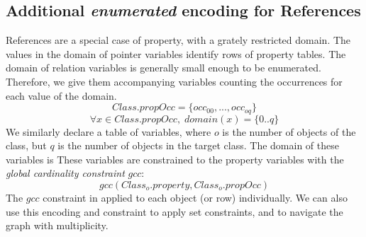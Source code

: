 \subsection{Additional \textit{enumerated} encoding for References}
References are a special case of property, with a grately restricted domain.
The values in the domain of pointer variables identify rows of property tables.
The domain of relation variables is generally small enough to be enumerated.
Therefore, we give them accompanying variables counting the occurrences for each value of the domain.
$$Class.propOcc = \{occ_{00},...,occ_{oq}\}$$
$$\forall x \in Class.propOcc,\;domain(x) = \{0..q\}$$
We similarly declare a table of variables, where $o$ is the number of objects of the class, but $q$ is the number of objects in the target class.
The domain of these variables is 
These variables are constrained to the property variables with the \textit{global cardinality constraint} $gcc$: 
$$gcc(\mathit{Class_o.property}, \mathit{Class_o.propOcc})$$
The $gcc$ constraint in applied to each object (or row) individually.
We can also use this encoding and constraint to apply set constraints, and to navigate the graph with multiplicity.